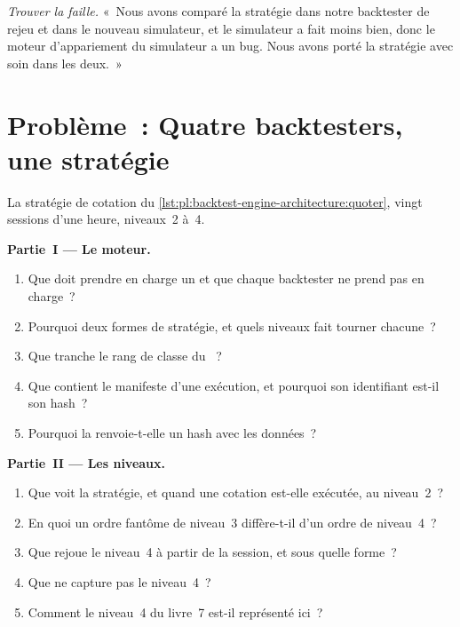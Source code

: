 \begin{exercise}[$\star\star\star$]\label{exo:pl:backtest-engine-architecture:8}
\emph{Trouver la faille.} «~Nous avons comparé la stratégie dans notre backtester de rejeu et dans le nouveau simulateur, et le simulateur a fait moins bien, donc le
moteur d'appariement du simulateur a un bug. Nous avons porté la stratégie avec soin dans les deux.~»
\end{exercise}

\section{Problème~: Quatre backtesters, une stratégie}

\begin{problem}\label{pb:pl:backtest-engine-architecture:1}
La stratégie de cotation du \cref{lst:pl:backtest-engine-architecture:quoter}, vingt sessions d'une heure, niveaux~2 à~4.

\medskip\noindent\textbf{Partie~I --- Le moteur.}
\begin{enumerate}
\item Que doit prendre en charge un  et que chaque backtester ne prend pas en charge~?
\item Pourquoi deux formes de stratégie, et quels niveaux fait tourner chacune~?
\item Que tranche le rang de classe du ~?
\item Que contient le manifeste d'une exécution, et pourquoi son identifiant est-il son hash~?
\item Pourquoi la  renvoie-t-elle un hash avec les données~?
\end{enumerate}

\medskip\noindent\textbf{Partie~II --- Les niveaux.}
\begin{enumerate}[resume]
\item Que voit la stratégie, et quand une cotation est-elle exécutée, au niveau~2~?
\item En quoi un ordre fantôme de niveau~3 diffère-t-il d'un ordre de niveau~4~?
\item Que rejoue le niveau~4 à partir de la session, et sous quelle forme~?
\item Que ne capture pas le niveau~4~?
\item Comment le niveau~4 du livre~7 est-il représenté ici~?
\end{enumerate}


\end{problem}
